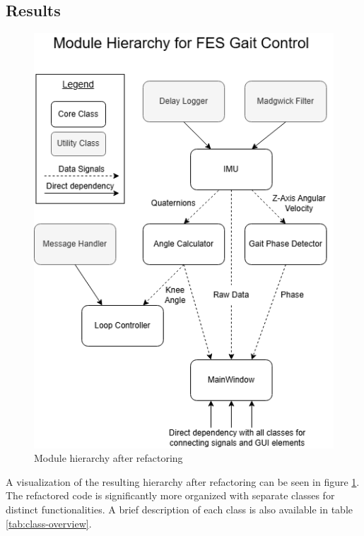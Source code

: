 \subsection{Results}
\begin{figure} [h]
    \centering
    \includegraphics[width=0.6\linewidth]{images/gaitcontrol.png}
    \caption{Module hierarchy after refactoring}
    \label{fig:modulehier}
\end{figure}
A visualization of the resulting hierarchy after refactoring can be seen in figure \ref{fig:modulehier}. The refactored code is significantly more organized with separate classes for distinct functionalities. A brief description of each class is also available in table \ref{tab:class-overview}.

